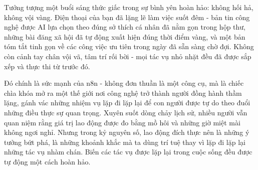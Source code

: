 \documentclass[a4paper,12pt,oneside]{book}
\begin{document}
\begin{center}
\end{center}


Tưởng tượng một buổi sáng thức giấc trong sự bình yên hoàn hảo: không hối hả, không vội vàng. Điện thoại của bạn đã lặng lẽ làm việc suốt đêm - bản tin công nghệ được AI lựa chọn theo đúng sở thích cá nhân đã nằm gọn trong hộp thư, những bài đăng xã hội đã tự động xuất hiện đúng thời điểm vàng, và một bản tóm tắt tinh gọn về các công việc ưu tiên trong ngày đã sẵn sàng chờ đợi. Không còn cảnh tay chân vội vã, tâm trí rối bời - mọi tác vụ nhỏ nhặt đều đã được sắp xếp và thực thi từ trước đó.

Đó chính là sức mạnh của n8n - không đơn thuần là một công cụ, mà là chiếc chìa khóa mở ra một thế giới nơi công nghệ trở thành người đồng hành thầm lặng, gánh vác những nhiệm vụ lặp đi lặp lại để con người được tự do theo đuổi những điều thực sự quan trọng. Xuyên suốt dòng chảy lịch sử, nhiều người vẫn quan niệm rằng giá trị lao động được đo bằng mồ hôi và những giờ miệt mài không ngơi nghỉ. 
Nhưng trong kỷ nguyên số, lao động đích thực nên là những ý tưởng bứt phá, là những khoảnh khắc mà ta dùng trí tuệ thay vì lặp đi lặp lại những tác vụ nhàm chán. Biến các tác vụ được lặp lại trong cuộc sống đều được tự động một cách hoàn hảo.
\end{document}
